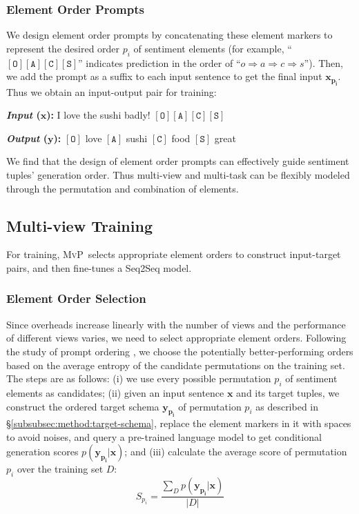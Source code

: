 \documentclass[11pt]{article}
\newcommand\mvp{\textsc{MvP}}
\begin{document}
\subsubsection{Element Order Prompts}
\label{subsubsec:method:order-prompt}
We design element order prompts by concatenating these element markers to represent the desired order $p_i$ of sentiment elements (for example, ``$\mathtt{[O][A][C][S]}$'' indicates prediction in the order of ``$o\Rightarrow a \Rightarrow c \Rightarrow s$''). Then, we add the prompt as a suffix to each input sentence to get the final input $\boldsymbol{x_{p_i}}$. Thus we obtain an input-output pair for training:

\textbf{\emph{Input} ($\boldsymbol{x}$):} I love the sushi badly! $\mathtt{[O][A][C][S]}$

\textbf{\emph{Output} ($\boldsymbol{y}$):} $[\mathtt{O}]$ love $[\mathtt{A}]$ sushi $[\mathtt{C}]$ food $[\mathtt{S}]$ great

We find that the design of element order prompts can effectively guide sentiment tuples' generation order. Thus multi-view and multi-task can be flexibly modeled through the permutation and combination of elements.


\subsection{Multi-view Training}
\label{subsec:method:mult-view-training}

For training, \mvp~selects appropriate element orders to construct input-target pairs, and then fine-tunes a Seq2Seq model.

\subsubsection{Element Order Selection}
\label{subsubsec:method:order-select}
Since overheads increase linearly with the number of views and the performance of different views varies, we need to select appropriate element orders.
Following the study of prompt ordering \cite{lu-etal-2022-fantastically, hu-etal-2022-improving-aspect}, we choose the potentially better-performing orders based on the average entropy of the candidate permutations on the training set. The steps are as follows:
(i) we use every possible permutation $p_i$ of sentiment elements as candidates;
(ii) given an input sentence $\boldsymbol{x}$ and its target tuples, we construct the ordered target schema $\boldsymbol{y_{p_i}}$ of permutation $p_i$ as described in \S \ref{subsubsec:method:target-schema}, replace the element markers in it with spaces to avoid noises, and query a pre-trained language model to get conditional generation scores $p(\boldsymbol{y_{p_i}}|\boldsymbol{x})$;
and (iii) calculate the average score of permutation $p_i$ over the training set $D$: 
\begin{equation}
     S_{p_i}=\frac{\sum_{D}p(\boldsymbol{y_{p_i}}|\boldsymbol{x})}{|D|}   
\end{equation}
\end{document}
